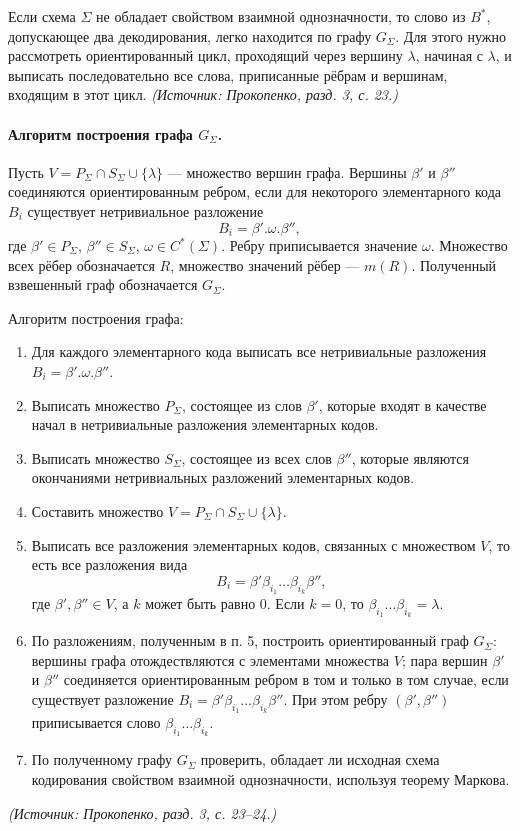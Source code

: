\documentclass[a4paper,12pt]{article}
\begin{document}
Если схема \(\Sigma\) не обладает свойством взаимной однозначности, то слово из \(B^*\), допускающее два декодирования, легко находится по графу \(G_\Sigma\). Для этого нужно рассмотреть ориентированный цикл, проходящий через вершину \(\lambda\), начиная с \(\lambda\), и выписать последовательно все слова, приписанные рёбрам и вершинам, входящим в этот цикл.
\textit{(Источник: Прокопенко, разд. 3, с. 23.)}

\paragraph{Алгоритм построения графа \(G_\Sigma\).}
Пусть \(V=P_\Sigma\cap S_\Sigma\cup\{\lambda\}\) — множество вершин графа. Вершины \(\beta'\) и \(\beta''\) соединяются ориентированным ребром, если для некоторого элементарного кода \(B_i\) существует нетривиальное разложение
\[
B_i=\beta'.\omega.\beta'',
\]
где \(\beta'\in P_\Sigma\), \(\beta''\in S_\Sigma\), \(\omega\in C^*(\Sigma)\). Ребру приписывается значение \(\omega\). Множество всех рёбер обозначается \(R\), множество значений рёбер — \(m(R)\). Полученный взвешенный граф обозначается \(G_\Sigma\).

Алгоритм построения графа:
\begin{enumerate}[label=\arabic*)]
\item Для каждого элементарного кода выписать все нетривиальные разложения \(B_i=\beta'.\omega.\beta''\).
\item Выписать множество \(P_\Sigma\), состоящее из слов \(\beta'\), которые входят в качестве начал в нетривиальные разложения элементарных кодов.
\item Выписать множество \(S_\Sigma\), состоящее из всех слов \(\beta''\), которые являются окончаниями нетривиальных разложений элементарных кодов.
\item Составить множество \(V=P_\Sigma\cap S_\Sigma\cup\{\lambda\}\).
\item Выписать все разложения элементарных кодов, связанных с множеством \(V\), то есть все разложения вида
\[
B_i=\beta'\beta_{i_1}\dots\beta_{i_k}\beta'',
\]
где \(\beta',\beta''\in V\), а \(k\) может быть равно \(0\). Если \(k=0\), то \(\beta_{i_1}\dots\beta_{i_k}=\lambda\).
\item По разложениям, полученным в п. 5, построить ориентированный граф \(G_\Sigma\): вершины графа отождествляются с элементами множества \(V\); пара вершин \(\beta'\) и \(\beta''\) соединяется ориентированным ребром в том и только в том случае, если существует разложение \(B_i=\beta'\beta_{i_1}\dots\beta_{i_k}\beta''\). При этом ребру \((\beta',\beta'')\) приписывается слово \(\beta_{i_1}\dots\beta_{i_k}\).
\item По полученному графу \(G_\Sigma\) проверить, обладает ли исходная схема кодирования свойством взаимной однозначности, используя теорему Маркова.
\end{enumerate}
\textit{(Источник: Прокопенко, разд. 3, с. 23--24.)}
\end{document}
